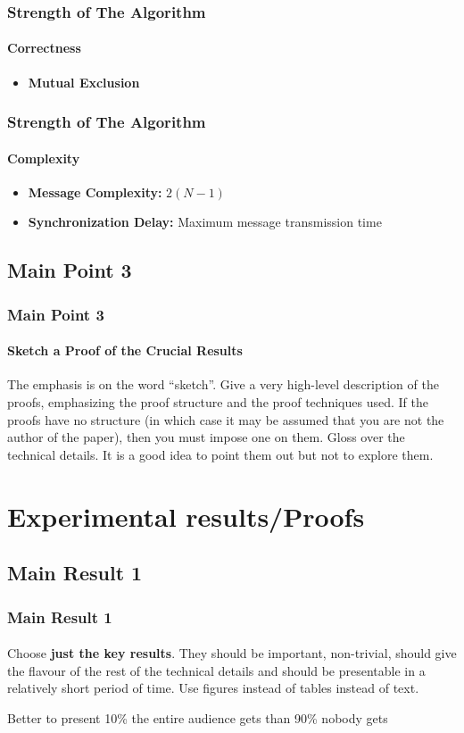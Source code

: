 \documentclass[11pt]{beamer}              %
\begin{document}
\begin{frame}
\frametitle{Strength of The Algorithm}
\framesubtitle{Correctness}
\begin{itemize}
    \item \textbf{Mutual Exclusion}
\end{itemize}
\end{frame}

\begin{frame}
\frametitle{Strength of The Algorithm}
\framesubtitle{Complexity}
\begin{itemize}
    \item \textbf{Message Complexity:} $2(N-1)$
    \item \textbf{Synchronization Delay:} Maximum message transmission time
\end{itemize}
\end{frame}

\subsection{Main Point 3}
\begin{frame}
\frametitle{Main Point 3}
\framesubtitle{Sketch a Proof of the Crucial Results}
The emphasis is on the word ``sketch''. Give a very high-level description of the proofs, emphasizing the proof structure and the proof techniques used. If the proofs have no structure (in which case it may be assumed that you are not the author of the paper), then you must impose one on them. Gloss over the technical details. It is a good idea to point them out but not to explore them.
\end{frame}


\section{Experimental results/Proofs}

\subsection{Main Result 1}
\begin{frame}
\frametitle{Main Result 1}
\framesubtitle{}
Choose \textbf{just the key results}. They should be important, non-trivial, should give the flavour of the rest of the technical details and should be presentable in a relatively short period of time. Use figures instead of tables instead of text.

Better to present 10\% the entire audience gets than 90\% nobody gets
\end{frame}
\end{document}
